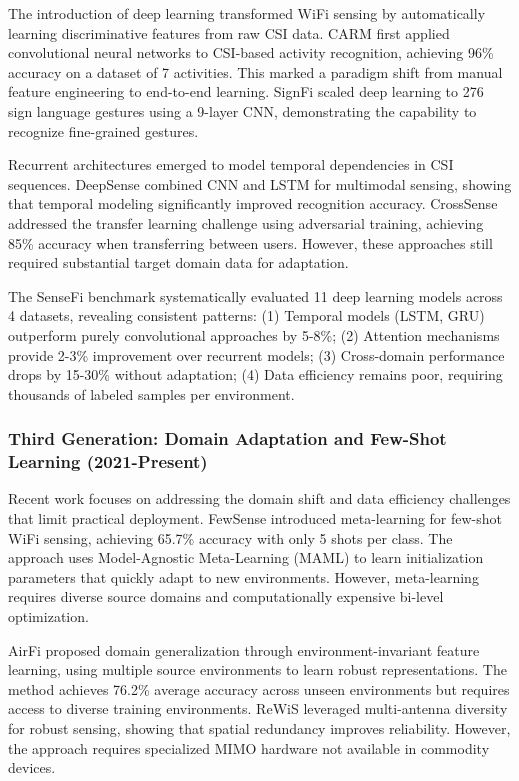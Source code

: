 \documentclass[10pt,journal,compsoc]{IEEEtran}
\begin{document}
The introduction of deep learning transformed WiFi sensing by automatically learning discriminative features from raw CSI data. CARM \cite{carm2017} first applied convolutional neural networks to CSI-based activity recognition, achieving 96\% accuracy on a dataset of 7 activities. This marked a paradigm shift from manual feature engineering to end-to-end learning. SignFi \cite{signfi2018} scaled deep learning to 276 sign language gestures using a 9-layer CNN, demonstrating the capability to recognize fine-grained gestures.

Recurrent architectures emerged to model temporal dependencies in CSI sequences. DeepSense \cite{deepsense2017} combined CNN and LSTM for multimodal sensing, showing that temporal modeling significantly improved recognition accuracy. CrossSense \cite{crosssense2018} addressed the transfer learning challenge using adversarial training, achieving 85\% accuracy when transferring between users. However, these approaches still required substantial target domain data for adaptation.

The SenseFi benchmark \cite{yang2023sensefi} systematically evaluated 11 deep learning models across 4 datasets, revealing consistent patterns: (1) Temporal models (LSTM, GRU) outperform purely convolutional approaches by 5-8\%; (2) Attention mechanisms provide 2-3\% improvement over recurrent models; (3) Cross-domain performance drops by 15-30\% without adaptation; (4) Data efficiency remains poor, requiring thousands of labeled samples per environment.

\subsubsection{Third Generation: Domain Adaptation and Few-Shot Learning (2021-Present)}

Recent work focuses on addressing the domain shift and data efficiency challenges that limit practical deployment. FewSense \cite{fewsense2022} introduced meta-learning for few-shot WiFi sensing, achieving 65.7\% accuracy with only 5 shots per class. The approach uses Model-Agnostic Meta-Learning (MAML) to learn initialization parameters that quickly adapt to new environments. However, meta-learning requires diverse source domains and computationally expensive bi-level optimization.

AirFi \cite{airfi2022} proposed domain generalization through environment-invariant feature learning, using multiple source environments to learn robust representations. The method achieves 76.2\% average accuracy across unseen environments but requires access to diverse training environments. ReWiS \cite{rewis2022} leveraged multi-antenna diversity for robust sensing, showing that spatial redundancy improves reliability. However, the approach requires specialized MIMO hardware not available in commodity devices.
\end{document}
